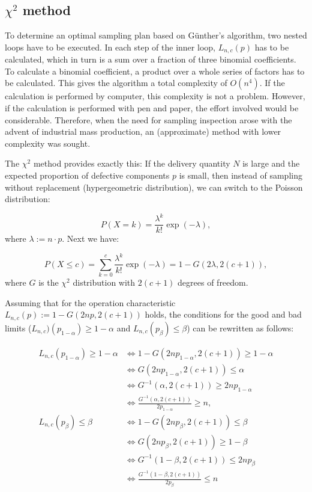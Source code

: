 \documentclass[a4paper,11pt,oneside]{article}
\begin{document}
\subsection[Chi-square method]{$\chi^2$ method}

To determine an optimal sampling plan based on Günther's algorithm, two nested loops have to be executed. In each step of the inner loop, $L_{n,c}(p)$ has to be calculated, which in turn is a sum over a fraction of three binomial coefficients. To calculate a binomial coefficient, a product over a whole series of factors has to be calculated. This gives the algorithm a total complexity of $O(n^4)$. If the calculation is performed by computer, this complexity is not a problem. However, if the calculation is performed with pen and paper, the effort involved would be considerable. Therefore, when the need for sampling inspection arose with the advent of industrial mass production, an (approximate) method with lower complexity was sought.

The $\chi^2$ method provides exactly this: If the delivery quantity $N$ is large and the expected proportion of defective components $p$ is small, then instead of sampling without replacement (hypergeometric distribution), we can switch to the Poisson distribution:

$$
P(X=k)=\frac{\lambda^k}{k!}\exp(-\lambda),
$$
where $\lambda:=n\cdot p$. Next we have:

\begin{equation}\label{eq:LPoisson}
P(X\le c)=
\sum_{k=0}^c \frac{\lambda^k}{k!}\exp(-\lambda)=
1-G(2\lambda,2(c+1)),
\end{equation}
where $G$ is the $\chi^2$ distribution with $2(c+1)$ degrees of freedom.

Assuming that for the operation characteristic $L_{n,c}(p):=1-G(2np,2(c+1))$ holds, the conditions for the good and bad limits ($L_{n,c})(p_{1-\alpha})\ge1-\alpha$ and $L_{n,c}(p_\beta)\le\beta$) can be rewritten as follows:

\begin{align*}
L_{n,c}(p_{1-\alpha}) \ge 1-\alpha
&\iff 1-G(2np_{1-\alpha},2(c+1))\ge1-\alpha\\
&\iff G(2np_{1-\alpha},2(c+1)) \le\alpha\\
&\iff G^{-1}(\alpha,2(c+1))\ge2np_{1-\alpha}\\
&\iff \frac{G^{-1}(\alpha,2(c+1))}{2p_{1-\alpha}}\ge n,\\[2ex]
L_{n,c}(p_\beta)\le\beta
&\iff 1-G(2np_\beta,2(c+1))\le\beta\\
&\iff G(2np_\beta,2(c+1))\ge1-\beta\\
&\iff G^{-1}(1-\beta,2(c+1))\le2np_\beta\\
&\iff \frac{G^{-1}(1-\beta,2(c+1))}{2p_\beta}\le n
\end{align*}
\end{document}
